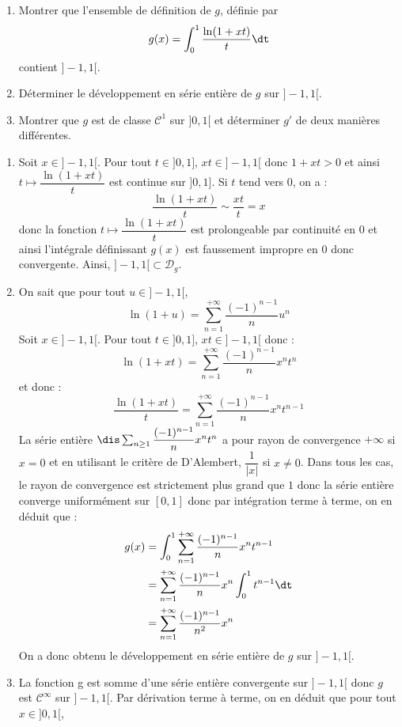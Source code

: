 \documentclass[a4paper,10pt]{report}
\begin{document}
\begin{Exa} \begin{enumerate}
\item Montrer que l'ensemble de définition de $g$, définie par 
$$ g(x) = \int_{0}^1 \dfrac{\ln(1+xt)}{t} \dt$$
contient $]-1,1[$.
\item Déterminer le développement en série entière de $g$ sur $]-1,1[$.
\item Montrer que $g$ est de classe $\mathcal{C}^1$ sur $]0,1[$ et déterminer $g'$ de deux manières différentes.
\end{enumerate}
\end{Exa}

\corr \begin{enumerate}
\item Soit $x \in ]-1,1[$. Pour tout $t \in ]0,1]$, $xt \in ]-1,1[$ donc $1+xt >0$ et ainsi $t \mapsto \dfrac{\ln(1+xt)}{t} $ est continue sur $]0,1]$. Si $t$ tend vers $0$, on a :
$$ \dfrac{\ln(1+xt)}{t}  \sim \dfrac{xt}{t}= x$$
donc la fonction $t \mapsto \dfrac{\ln(1+xt)}{t} $ est prolongeable par continuité en $0$ et ainsi l'intégrale définissant $g(x)$ est faussement impropre en $0$ donc convergente. Ainsi, $]-1,1[ \subset \mathcal{D}_g$.
\item On sait que pour tout $u \in ]-1,1[$,
$$ \ln(1+u) = \sum_{n=1}^{+ \infty} \dfrac{(-1)^{n-1}}{n} u^n$$
Soit $x \in ]-1,1[$. Pour tout $t \in ]0,1]$, $xt \in ]-1,1[$ donc :
$$ \ln(1+xt) = \sum_{n=1}^{+ \infty} \dfrac{(-1)^{n-1}}{n} x^n t^n$$
et donc :
$$ \dfrac{\ln(1+xt)}{t} = \sum_{n=1}^{+ \infty} \dfrac{(-1)^{n-1}}{n} x^n t^{n-1}$$
La série entière $\dis \sum_{n \geq 1} \dfrac{(-1)^{n-1}}{n} x^n t^n$ a pour rayon de convergence $+ \infty$ si $x=0$ et en utilisant le critère de D'Alembert, $\dfrac{1}{\vert x \vert}$ si $x \neq 0$. Dans tous les cas, le rayon de convergence est strictement plus grand que $1$ donc la série entière converge uniformément sur $[0,1]$ donc par intégration terme à terme, on en déduit que :
\begin{align*}
g(x) & = \int_{0}^1 \sum_{n=1}^{+ \infty} \dfrac{(-1)^{n-1}}{n} x^n t^{n-1} \\
& = \sum_{n=1}^{+ \infty} \dfrac{(-1)^{n-1}}{n} x^n \int_{0}^1 t^{n-1} \dt \\
& = \sum_{n=1}^{+ \infty} \dfrac{(-1)^{n-1}}{n^2} x^n
\end{align*} 
On a donc obtenu le développement en série entière de $g$ sur $]-1,1[$.
\item La fonction g est somme d'une série entière convergente sur $]-1,1[$ donc $g$ est $\mathcal{C}^{\infty}$ sur $]-1,1[$. Par dérivation terme à terme, on en déduit que pour tout $x \in ]0,1[$,

\end{enumerate}
\end{document}
